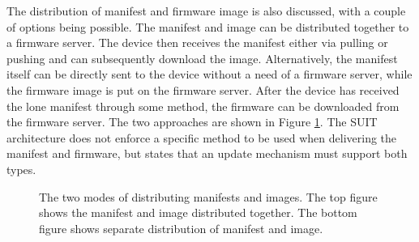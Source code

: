 \documentclass[0-thesis.tex]{subfiles}
\begin{document}
The distribution of manifest and firmware image is also discussed, with a couple of
options being possible. The manifest and image can be distributed together to a firmware
server. The device then receives the manifest either via pulling or pushing and can
subsequently download the image. Alternatively, the manifest itself can be directly sent
to the device without a need of a firmware server, while the firmware image is put on the
firmware server. After the device has received the lone manifest through some method, the
firmware can be downloaded from the firmware server. The two approaches are shown in
Figure \ref{fig:manifest-image-distribution}. The SUIT architecture does not enforce a
specific method to be used when delivering the manifest and firmware, but states that an
update mechanism must support both types.

\begin{figure}
    \caption{The two modes of distributing manifests and images. The top figure shows the 
            manifest and image distributed together. The bottom figure shows separate
            distribution of manifest and image.}   
    \label{fig:manifest-image-distribution}

\end{figure}
\end{document}
